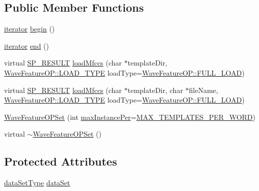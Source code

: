 \subsection*{Public Member Functions}
\begin{DoxyCompactItemize}
\item 
\hyperlink{class_wave_feature_o_p_set_1_1iterator}{iterator} \hyperlink{class_wave_feature_o_p_set_ac5aad41310f38626a922ec74920b7a0e}{begin} ()
\item 
\hyperlink{class_wave_feature_o_p_set_1_1iterator}{iterator} \hyperlink{class_wave_feature_o_p_set_a7df62d3222f8896143b8a0c336ccbb18}{end} ()
\item 
virtual \hyperlink{tool_8h_ab71a1f2fb85a32402ced5c483105b38e}{S\+P\+\_\+\+R\+E\+S\+U\+L\+T} \hyperlink{class_wave_feature_o_p_set_ac0643637484df06ccf4336a48cd4f765}{load\+Mfccs} (char $\ast$template\+Dir, \hyperlink{class_wave_feature_o_p_abd93c85d1ed5fbc148d41b7f32fc1d84}{Wave\+Feature\+O\+P\+::\+L\+O\+A\+D\+\_\+\+T\+Y\+P\+E} load\+Type=\hyperlink{class_wave_feature_o_p_abd93c85d1ed5fbc148d41b7f32fc1d84a1b64a07dfde0c2d4132bc343f4475856}{Wave\+Feature\+O\+P\+::\+F\+U\+L\+L\+\_\+\+L\+O\+A\+D})
\item 
virtual \hyperlink{tool_8h_ab71a1f2fb85a32402ced5c483105b38e}{S\+P\+\_\+\+R\+E\+S\+U\+L\+T} \hyperlink{class_wave_feature_o_p_set_ab1bc5a7acaba431993da7d784390bd83}{load\+Mfccs} (char $\ast$template\+Dir, char $\ast$file\+Name, \hyperlink{class_wave_feature_o_p_abd93c85d1ed5fbc148d41b7f32fc1d84}{Wave\+Feature\+O\+P\+::\+L\+O\+A\+D\+\_\+\+T\+Y\+P\+E} load\+Type=\hyperlink{class_wave_feature_o_p_abd93c85d1ed5fbc148d41b7f32fc1d84a1b64a07dfde0c2d4132bc343f4475856}{Wave\+Feature\+O\+P\+::\+F\+U\+L\+L\+\_\+\+L\+O\+A\+D})
\item 
\hyperlink{class_wave_feature_o_p_set_abc2105d69e5f9b1cad09b83de86a4d00}{Wave\+Feature\+O\+P\+Set} (int \hyperlink{pro4__demo__1_8cpp_adc01d2f6980a1af5c3ddc83d847dafa0}{max\+Instance\+Per}=\hyperlink{configure__dtw_8h_a5e1cc8ac4ebc0912817c618ccc9d823b}{M\+A\+X\+\_\+\+T\+E\+M\+P\+L\+A\+T\+E\+S\+\_\+\+P\+E\+R\+\_\+\+W\+O\+R\+D})
\item 
virtual \hyperlink{class_wave_feature_o_p_set_acbc8ed8d5dcf2624dcc1a985baa63c8e}{$\sim$\+Wave\+Feature\+O\+P\+Set} ()
\end{DoxyCompactItemize}
\subsection*{Protected Attributes}
\begin{DoxyCompactItemize}
\item 
\hyperlink{class_wave_feature_o_p_set_a7145e9463a1fb85ce4c239552bf4e8e0}{data\+Set\+Type} \hyperlink{class_wave_feature_o_p_set_ab536eab1f12dec8e95c4459f6cbcd3f1}{data\+Set}
\end{DoxyCompactItemize}
